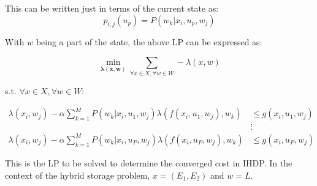 \documentclass{article}
\begin{document}
	
	
	
	This can be written just in terms of the current state as:
	\begin{displaymath} 
	p_{i,j}(u_{p})=P(w_{k} | x_{i},u_{p},w_{j})
	\end{displaymath}
	
	With $w$ being a part of the state, the above LP can be expressed as:
	
	\begin{equation} \label{eq:prelimLP}
	\min_{\boldsymbol{\lambda(x,w)}} \sum_{\forall x \in X,\forall w \in W} -\lambda(x,w)
	\end{equation}
	
	s.t. $\forall x \in X,\forall w \in W$:
	
	
	\begin{align*}
	\lambda(x_{i},w_{j})-\alpha\sum_{k=1}^{M}P(w_{k} | x_{i},u_{1},w_{j})\lambda(f(x_{i},u_{1},w_{j}),w_{k}) &\leq g(x_{i},u_{1},w_{j}) \\
	&\vdots\\
	\lambda(x_{i},w_{j})-\alpha\sum_{k=1}^{M}P(w_{k} | x_{i},u_{P},w_{j})\lambda(f(x_{i},u_{P},w_{j}),w_{k}) &\leq g(x_{i},u_{P},w_{j})
	\end{align*}
	
	This is the LP to be solved to determine the converged cost in IHDP. In the context of the hybrid storage problem, $x=(E_{1},E_{2})$ and $w=L$.
	
\end{document}
